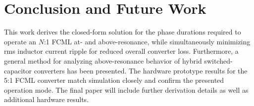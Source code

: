 
\vspace{-10pt}
\section{Conclusion and Future Work}
\vspace{-0.75em}
This work derives the closed-form solution for the phase durations required to operate an $N$:1 FCML at- and above-resonance, while simultaneously minimizing rms inductor current ripple for reduced overall converter loss. Furthermore, a general method for analyzing above-resonance behavior of hybrid switched-capacitor converters has been presented. The hardware prototype results for the 5:1 FCML converter match simulation closely and confirm the presented operation mode. The final paper will include further derivation details as well as additional hardware results. 